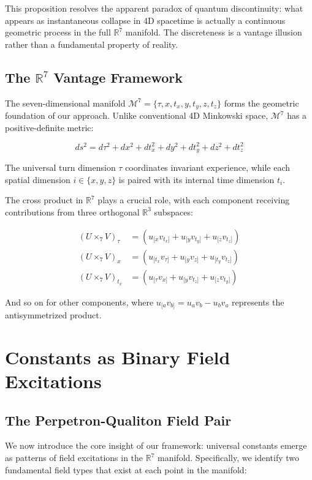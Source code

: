 \documentclass{article}
\begin{document}
This proposition resolves the apparent paradox of quantum discontinuity: what appears as instantaneous collapse in 4D spacetime is actually a continuous geometric process in the full $\mathbb{R}^7$ manifold. The discreteness is a vantage illusion rather than a fundamental property of reality.

\subsection{The $\mathbb{R}^7$ Vantage Framework}

The seven-dimensional manifold $\mathcal{M}^7 = \{\tau, x, t_x, y, t_y, z, t_z\}$ forms the geometric foundation of our approach. Unlike conventional 4D Minkowski space, $\mathcal{M}^7$ has a positive-definite metric:

\begin{equation}
ds^2 = d\tau^2 + dx^2 + dt_x^2 + dy^2 + dt_y^2 + dz^2 + dt_z^2
\end{equation}

The universal turn dimension $\tau$ coordinates invariant experience, while each spatial dimension $i \in \{x, y, z\}$ is paired with its internal time dimension $t_i$.

The cross product in $\mathbb{R}^7$ plays a crucial role, with each component receiving contributions from three orthogonal $\mathbb{R}^3$ subspaces:

\begin{align}
(U \times_7 V)_\tau &= (u_{[x}v_{t_x]} + u_{[y}v_{t_y]} + u_{[z}v_{t_z]})\\
(U \times_7 V)_x &= (u_{[t_x}v_{\tau]} + u_{[y}v_{z]} + u_{[t_y}v_{t_z]})\\
(U \times_7 V)_{t_x} &= (u_{[\tau}v_{x]} + u_{[y}v_{t_z]} + u_{[z}v_{t_y]})
\end{align}

And so on for other components, where $u_{[a}v_{b]} = u_a v_b - u_b v_a$ represents the antisymmetrized product.

\section{Constants as Binary Field Excitations}

\subsection{The Perpetron-Qualiton Field Pair}

We now introduce the core insight of our framework: universal constants emerge as patterns of field excitations in the $\mathbb{R}^7$ manifold. Specifically, we identify two fundamental field types that exist at each point in the manifold:
\end{document}
